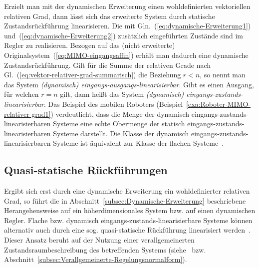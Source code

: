 Erzielt man mit der dynamischen Erweiterung einen wohldefinierten
vektoriellen relativen Grad, dann lässt sich das erweiterte System
durch statische Zustandsrückführung linearisieren. Die mit Gln.~(\ref{eq:dynamische-Erweiterung1})
und~(\ref{eq:dynamische-Erweiterung2}) zusätzlich eingeführten Zustände
sind im Regler zu realisieren. Bezogen auf das (nicht erweiterte)
Originalsystem~(\ref{eq:MIMO-eingangsaffin}) erhält man dadurch
eine dynamische Zustandsrückführung.
Gilt für die Summe der relativen Grade nach Gl.~(\ref{eq:vektor-relativer-grad-summarisch})
die Beziehung $r<n$, so nennt man das System \emph{(dynamisch) eingangs-ausgangs-linearisierbar}.
Gibt es einen Ausgang, für welchen $r=n$ gilt, dann heißt das System
\emph{(dynamisch) eingangs-zustands-linearisierbar}.
Das Beispiel des mobilen Roboters (Beispiel~\ref{exa:Roboter-MIMO-relativer-grad1})
verdeutlicht, dass die Menge der dynamisch eingangs-zustands-linearisierbaren
Systeme eine echte Obermenge der statisch eingangs-zustands-linearisierbaren
Systeme darstellt. Die Klasse der dynamisch eingangs-zustands-linearisierbaren
Systeme ist äquivalent zur Klasse der flachen Systeme~\cite{levine2007equivalence}.

\subsection{Quasi-statische Rückführungen\label{subsec:Quasi-statisch}}

Ergibt sich erst durch eine dynamische Erweiterung ein wohldefinierter
relativen Grad, so führt die in Abschnitt~\ref{subsec:Dynamische-Erweiterung}
beschriebene Herangehensweise auf ein höherdimensionales System bzw.
auf einen dynamischen Regler. Flache bzw. dynamisch eingangs-zustands-linearisierbare
Systeme können alternativ auch durch eine sog. quasi-statische Rückführung
linearisiert werden~\cite{delaleau1998,rudolph2005at}. Dieser Ansatz
beruht auf der Nutzung einer verallgemeinerten Zustandsraumbeschreibung
des betreffenden Systems (siehe~\cite{glad1989nonlinear,fliess1990,delaleau1998lowering}
bzw. Abschnitt~\ref{subsec:Verallgemeinerte-Regelungsnormalform}).\nocite{descusse1989trends}

